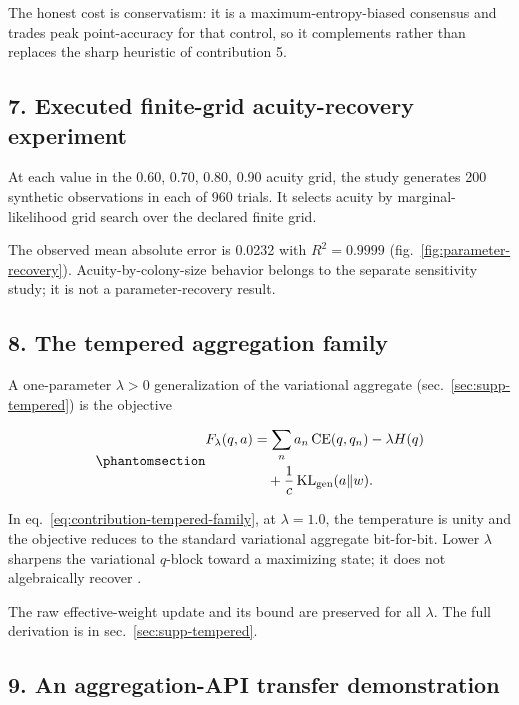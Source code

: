 \documentclass[
  english,
]{article}
\theoremstyle{plain}
\theoremstyle{definition}
\theoremstyle{remark}
\theoremstyle{definition}
\begin{document}
The honest cost is conservatism: it is a maximum-entropy-biased
consensus and trades peak point-accuracy for that control, so it
complements rather than replaces the sharp heuristic of contribution 5.

\subsection{7. Executed finite-grid acuity-recovery
experiment}\label{executed-finite-grid-acuity-recovery-experiment}

At each value in the 0.60, 0.70, 0.80, 0.90 acuity grid, the study
generates 200 synthetic observations in each of 960 trials. It selects
acuity by marginal-likelihood grid search over the declared finite grid.

The observed mean absolute error is 0.0232 with \(R^2 = 0.9999\)
(fig.~\ref{fig:parameter-recovery}). Acuity-by-colony-size behavior
belongs to the separate sensitivity study; it is not a
parameter-recovery result.

\subsection{8. The tempered aggregation
family}\label{the-tempered-aggregation-family}

A one-parameter \(\lambda>0\) generalization of the variational
aggregate (sec.~\ref{sec:supp-tempered}) is the objective

\begin{equation}\protect\phantomsection\label{eq:contribution-tempered-family}{\begin{aligned}
F_\lambda(q,a)
&= \sum_n a_n\,\mathrm{CE}(q,q_n)-\lambda H(q)\\
&\quad +\frac{1}{c}\,\mathrm{KL}_{\mathrm{gen}}(a\Vert w).
\end{aligned}}\end{equation}

In eq.~\ref{eq:contribution-tempered-family}, at \(\lambda = 1.0\), the
temperature is unity and the objective reduces to the standard
variational aggregate bit-for-bit. Lower \(\lambda\) sharpens the
variational \(q\)-block toward a maximizing state; it does not
algebraically recover .

The raw effective-weight update and its bound are preserved for all
\(\lambda\). The full derivation is in sec.~\ref{sec:supp-tempered}.

\subsection{9. An aggregation-API transfer
demonstration}\label{an-aggregation-api-transfer-demonstration}
\end{document}
